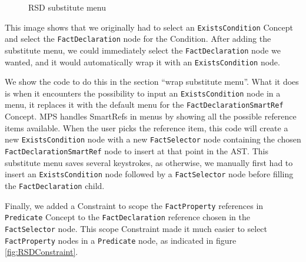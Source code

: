 \begin{figure}[h]
    \centering
    \caption{RSD substitute menu}
    \label{fig:RSDSubstituteMenu}
\end{figure}

This image shows that we originally had to select an \texttt{ExistsCondition} Concept and select the \linebreak\texttt{FactDeclaration} node for the Condition.
After adding the substitute menu, we could immediately select the \texttt{FactDeclaration} node we wanted, and it would automatically wrap it with an \texttt{ExistsCondition} node.

We show the code to do this in the section ``wrap substitute menu''.
What it does is when it encounters the possibility to input an \texttt{ExistsCondition} node in a menu, it replaces it with the default menu for the \linebreak\texttt{FactDeclarationSmartRef} Concept.
MPS handles SmartRefs in menus by showing all the possible reference items available.
When the user picks the reference item, this code will create a new \texttt{ExistsCondition} node with a new \texttt{FactSelector} node containing the chosen \texttt{FactDeclarationSmartRef} node to insert at that point in the AST.
This substitute menu saves several keystrokes, as otherwise, we manually first had to insert an \texttt{ExistsCondition} node followed by a \texttt{FactSelector} node before filling the \texttt{FactDeclaration} child.

Finally, we added a Constraint to scope the \texttt{FactProperty} references in \texttt{Predicate} Concept to the \linebreak\texttt{FactDeclaration} reference chosen in the \texttt{FactSelector} node.
This scope Constraint made it much easier to select \texttt{FactProperty} nodes in a \texttt{Predicate} node, as indicated in figure \ref{fig:RSDConstraint}.

